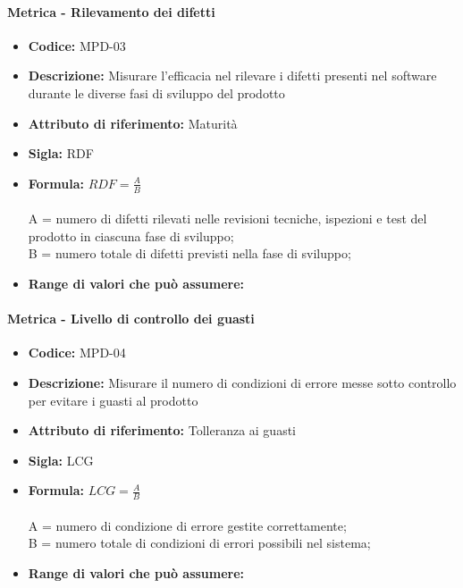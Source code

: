                 \paragraph{Metrica - Rilevamento dei difetti} 
                  \begin{itemize}
         \item   \textbf{Codice:} MPD-03
         \item   \textbf{Descrizione:} Misurare l'efficacia nel rilevare i difetti presenti nel software durante le diverse fasi di sviluppo del prodotto
        \item    \textbf{Attributo di riferimento:} Maturità
        \item    \textbf{Sigla:} RDF
        \item    \textbf{Formula:} \begin{math} RDF = \frac{A}{B}\end{math}\\ \\
             A = numero di difetti rilevati nelle revisioni tecniche, ispezioni e test del prodotto in ciascuna fase di sviluppo;\\
              B = numero totale di difetti previsti nella fase di sviluppo;
      \item    \textbf{Range di valori che può assumere:}      
                  \end{itemize}
                  
                  \paragraph{Metrica - Livello di controllo dei guasti}
                     \begin{itemize}
        \item    \textbf{Codice:} MPD-04
        \item    \textbf{Descrizione:} Misurare il numero di condizioni di errore messe sotto controllo per evitare i guasti al prodotto
         \item   \textbf{Attributo di riferimento:} Tolleranza ai guasti
       \item     \textbf{Sigla:} LCG
       \item     \textbf{Formula:} \begin{math} LCG = \frac{A}{B}\end{math}\\ \\
             A = numero di condizione di errore gestite correttamente;\\
              B = numero totale di condizioni di errori possibili nel sistema;
       \item    \textbf{Range di valori che può assumere:}  
       \end{itemize}
           
